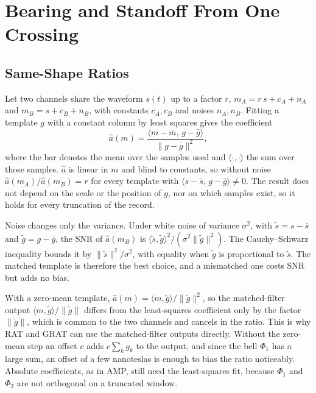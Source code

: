 \section{Bearing and Standoff From One Crossing}\label{app:observation}

\subsection{Same-Shape Ratios}\label{app:same_shape}

Let two channels share the waveform $s(t)$ up to a factor $r$, $m_A = r\, s + c_A + n_A$ and $m_B = s + c_B + n_B$, with constants $c_A, c_B$ and noises $n_A, n_B$. Fitting a template $g$ with a constant column by least squares gives the coefficient
\begin{equation}
\hat{a}(m) = \frac{\langle m - \bar{m},\, g - \bar{g} \rangle}{\| g - \bar{g} \|^2},
\label{eq:app_ls_coefficient}
\end{equation}
where the bar denotes the mean over the samples used and $\langle \cdot, \cdot \rangle$ the sum over those samples. $\hat{a}$ is linear in $m$ and blind to constants, so without noise $\hat{a}(m_A)/\hat{a}(m_B) = r$ for every template with $\langle s - \bar{s},\, g - \bar{g} \rangle \neq 0$. The result does not depend on the scale or the position of $g$, nor on which samples exist, so it holds for every truncation of the record.

Noise changes only the variance. Under white noise of variance $\sigma^2$, with $\tilde{s} = s - \bar{s}$ and $\tilde{g} = g - \bar{g}$, the SNR of $\hat{a}(m_B)$ is $\langle \tilde{s}, \tilde{g} \rangle^2 / (\sigma^2 \|\tilde{g}\|^2)$. The Cauchy--Schwarz inequality bounds it by $\|\tilde{s}\|^2/\sigma^2$, with equality when $\tilde{g}$ is proportional to $\tilde{s}$. The matched template is therefore the best choice, and a mismatched one costs SNR but adds no bias.

With a zero-mean template, $\hat{a}(m) = \langle m, \tilde{g} \rangle / \|\tilde{g}\|^2$, so the matched-filter output $\langle m, \tilde{g} \rangle / \|\tilde{g}\|$ differs from the least-squares coefficient only by the factor $\|\tilde{g}\|$, which is common to the two channels and cancels in the ratio. This is why RAT and GRAT can use the matched-filter outputs directly. Without the zero-mean step an offset $c$ adds $c\sum_k g_k$ to the output, and since the bell $\Phi_1$ has a large sum, an offset of a few nanoteslas is enough to bias the ratio noticeably. Absolute coefficients, as in AMP, still need the least-squares fit, because $\Phi_1$ and $\Phi_2$ are not orthogonal on a truncated window.

